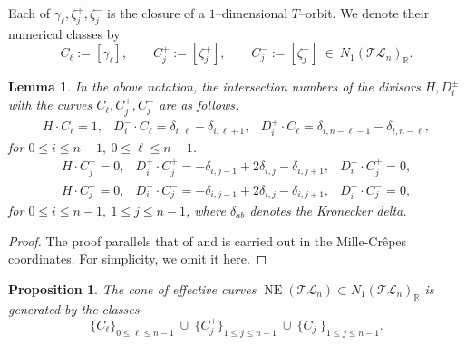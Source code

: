 \documentclass[10pt]{amsart}
\newtheorem{proposition}[theorem]{Proposition}
\newtheorem{lemma}[theorem]{Lemma}
\theoremstyle{definition}
\newcommand{\R}{\mathbb{R}}
\newcommand{\Pic}{\operatorname{Pic}}
\DeclareMathOperator{\NE}{NE}
\newcommand{\TL}{\mathcal{TL}}
\newcommand{\RL}{\mathrm{R}}
\theoremstyle{plain} %
\begin{document}
Each of $\gamma_\ell,\zeta_j^+,\zeta_j^-$ is the closure of a $1$--dimensional
$T$--orbit. We denote their numerical classes by
\[
C_\ell:=[\gamma_\ell],
\qquad
C_j^+:=[\zeta_j^+],
\qquad
C_j^-:=[\zeta_j^-]
\ \in\ N_1(\TL_n)_\R.
\]
\begin{lemma}\label{lem:intersection-table-correct}
In the above notation, the intersection numbers of the divisors
$H,D_i^\pm$ with the curves $C_\ell,C_j^+,C_j^-$ are as follows.
\[
\begin{array}{llll}
H\cdot C_\ell = 1,&
D_i^-\cdot C_\ell = \delta_{i,\ell}-\delta_{i,\ell+1},&
D_i^+\cdot C_\ell = \delta_{i,n-\ell-1}-\delta_{i,n-\ell},
\end{array}
\]
for $0\le i\le n-1,\ 0\le \ell\le n-1$.
\[
\begin{array}{llll}
H\cdot C_j^+ = 0,& D_i^+\cdot C_j^+ = -\delta_{i,j-1}+2\delta_{i,j}-\delta_{i,j+1},& D_i^-\cdot C_j^+ = 0,\\
H\cdot C_j^- = 0,& D_i^-\cdot C_j^- = -\delta_{i,j-1}+2\delta_{i,j}-\delta_{i,j+1},& D_i^+\cdot C_j^- = 0,
\end{array}
\]
for $0\le i\le n-1,\ 1\le j\le n-1$, where $\delta_{ab}$ denotes the Kronecker delta.
\end{lemma}

\begin{proof}
The proof parallels that of \cite[Lemma 3.13]{F26} and is carried out in the Mille-Crêpes coordinates. For simplicity, we omit it here. %
\end{proof}

\begin{proposition}\label{prop:Mori-generators-correct}
The cone of effective curves $\NE(\TL_n)\subset N_1(\TL_n)_\R$ is generated by
the classes
\begin{equation}\label{zetagamma}
\{C_\ell\}_{0\le\ell\le n-1}\ \cup\ \{C_j^+\}_{1\le j\le n-1}\ \cup\
\{C_j^-\}_{1\le j\le n-1}.
\end{equation}
\end{proposition}
\end{document}
